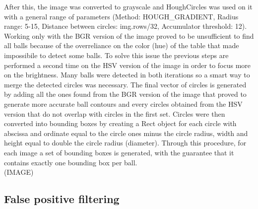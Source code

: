 After this, the image was converted to grayscale and HoughCircles was used on it with a general range
of parameters (Method: HOUGH\_GRADIENT, Radius range: 5-15, Distance between circles: img.rows/32, Accumulator threshold: 12).
Working only with the BGR version of the image proved to be unsufficient to find all balls because of the 
overreliance on the color (hue) of the table that made impossibile to detect some balls. To solve this issue
the previous steps are performed a second time on the HSV version of the image in order to focus more on 
the brightness. 
Many balls were detected in both iterations so a smart way to merge the detected circles was necessary.
The final vector of circles is generated by adding all the ones found from the BGR version of the image that proved 
to generate more accurate ball contours and every circles obtained from the HSV version that do not overlap with circles
in the first set.  
Circles were then converted into bounding boxes by creating a Rect object for each circle with abscissa and ordinate equal to the circle ones minus the circle radius,
width and height equal to double the circle radius (diameter).
Through this procedure, for each image a set of bounding boxes is generated, with the guarantee that it contains exactly one bounding box per ball. \\
(IMAGE)


\subsection*{False positive filtering}

